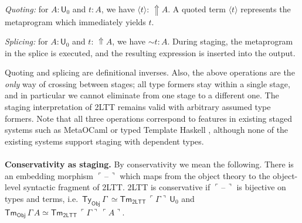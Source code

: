 \documentclass{easychair}
\newcommand{\msf}[1]{\mathsf{#1}}
\newcommand{\Lift}{{\Uparrow}}
\newcommand{\spl}{{\sim}}
\newcommand{\qut}[1]{\langle #1\rangle}
\newcommand{\U}{\msf{U}}
\newcommand{\Ty}{\msf{Ty}}
\newcommand{\Tm}{\msf{Tm}}
\newcommand{\blank}{{\mathord{\hspace{1pt}\text{--}\hspace{1pt}}}}
\newcommand{\emb}[1]{\ulcorner#1\urcorner}
\theoremstyle{remark}
\begin{document}
\emph{Quoting:} for $A : \U_0$ and $t : A$, we have $\qut{t} :\,\Lift A$.  A
quoted term $\qut{t}$ represents the metaprogram which immediately yields $t$.

\emph{Splicing:} for $A : \U_0$ and $t :\,\Lift A$, we have $\spl t : A$.
During staging, the metaprogram in the splice is executed, and the resulting
expression is inserted into the output.

Quoting and splicing are definitional inverses. Also, the above
operations are the \emph{only} way of crossing between stages; all type formers
stay within a single stage, and in particular we cannot eliminate from one stage
to a different one. The staging interpretation of 2LTT remains valid with
arbitrary assumed type formers. Note that all three operations correspond to
features in existing staged systems such as MetaOCaml \cite{kiselyov14metaocaml}
or typed Template Haskell \cite{typed-th}, although none of the existing systems
support staging with dependent types.
\\\\
\textbf{Conservativity as staging.} By conservativity we mean the following.
There is an embedding morphism $\emb{\blank}$ which maps from the object theory
to the object-level syntactic fragment of 2LTT. 2LTT is conservative if
$\emb{\blank}$ is bijective on types and terms,
i.e.\ $\Ty_{\msf{Obj}}\,\Gamma\ \simeq \Tm_{\msf{2LTT}}\,\emb{\Gamma}\,\U_0$ and
$\Tm_{\msf{Obj}}\,\Gamma\,A \simeq \Tm_{\msf{2LTT}}\,\emb{\Gamma}\,\emb{A}$.
\end{document}
